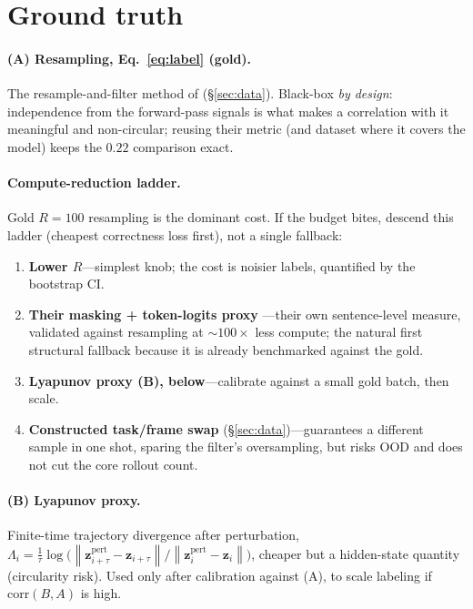 \documentclass[11pt]{article}
\newcommand{\zz}{\mathbf{z}}
\newcommand{\norm}[1]{\left\lVert #1 \right\rVert}
\begin{document}
\section{Ground truth}
\label{sec:groundtruth}
\paragraph{(A) Resampling, Eq.~\eqref{eq:label} (gold).} The resample-and-filter method of
\cite{bogdan2025thought} (\S\ref{sec:data}). Black-box \emph{by design}: independence from the
forward-pass signals is what makes a correlation with it meaningful and non-circular; reusing their
metric (and dataset where it covers the model) keeps the $0.22$ comparison exact.

\paragraph{Compute-reduction ladder.} Gold $R{=}100$ resampling is the dominant cost. If the budget
bites, descend this ladder (cheapest correctness loss first), not a single fallback:
\begin{enumerate}[leftmargin=1.6em,itemsep=2pt]
\item \textbf{Lower $R$}---simplest knob; the cost is noisier labels, quantified by the bootstrap CI.
\item \textbf{Their masking + token-logits proxy} \cite{bogdan2025thought}---their own sentence-level
measure, validated against resampling at ${\sim}100\times$ less compute; the natural first structural
fallback because it is already benchmarked against the gold.
\item \textbf{Lyapunov proxy (B), below}---calibrate against a small gold batch, then scale.
\item \textbf{Constructed task/frame swap} (\S\ref{sec:data})---guarantees a different sample in one
shot, sparing the filter's oversampling, but risks OOD and does not cut the core rollout count.
\end{enumerate}

\paragraph{(B) Lyapunov proxy.} Finite-time trajectory divergence after perturbation,
$\Lambda_i=\tfrac1\tau\log\!\big(\norm{\zz^{\text{pert}}_{i+\tau}-\zz_{i+\tau}}/\norm{\zz^{\text{pert}}_i-\zz_i}\big)$,
cheaper but a hidden-state quantity (circularity risk). Used only after calibration against (A), to
scale labeling if $\mathrm{corr}(B,A)$ is high.
\end{document}
